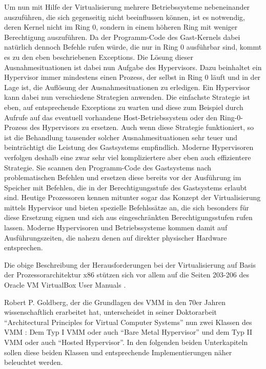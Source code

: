 Um nun mit Hilfe der Virtualisierung mehrere Betriebssysteme nebeneinander auszuführen, die sich gegenseitig nicht beeinflussen können, ist es notwendig, deren Kernel nicht im Ring 0, sondern in einem höheren Ring mit weniger Berechtigung auszuführen. Da der Programm-Code des Gast-Kernels dabei natürlich dennoch Befehle rufen würde, die nur in Ring 0 ausführbar sind, kommt es zu den eben beschriebenen Exceptions. Die Lösung dieser Ausnahmesituationen ist dabei nun Aufgabe des Hypervisors. Dazu beinhaltet ein Hypervisor immer mindestens einen Prozess, der selbst in Ring 0 läuft und in der Lage ist, die Auflösung der Ausnahmesituationen zu erledigen. Ein Hypervisor kann dabei nun verschiedene Strategien anwenden. Die einfachste Strategie ist eben, auf entsprechende Exceptions zu warten und diese zum Beispiel durch Aufrufe auf das eventuell vorhandene Host-Betriebssystem oder den Ring-0-Prozess des Hypervisors zu ersetzen. Auch wenn diese Strategie funktioniert, so ist die Behandlung tausender solcher Ausnahmesituationen sehr teuer und beinträchtigt die Leistung des Gastsystems empfindlich. Moderne Hypervisoren verfolgen deshalb eine zwar sehr viel kompliziertere aber eben auch effizientere Strategie. Sie scannen den Programm-Code des Gastsystems nach problematischen Befehlen und ersetzen diese bereits vor der Ausführung im Speicher mit Befehlen, die in der Berechtigungsstufe des Gastsystems erlaubt sind. Heutige Prozessoren kennen mitunter sogar das Konzept der Virtualisierung mittels Hypervisor und bieten spezielle Befehlssätze an, die sich besonders für diese Ersetzung eignen und sich aus eingeschränkten Berechtigungsstufen rufen lassen. Moderne Hypervisoren und Betriebssysteme kommen damit auf Ausführungszeiten, die nahezu denen auf direkter physischer Hardware entsprechen.

Die obige Beschreibung der Herausforderungen bei der Virtualisierung auf Basis der Prozessorarchitektur x86 stützen sich vor allem auf die Seiten 203-206 des Oracle VM VirtualBox User Manuals \citep{Oracle14}.

Robert P. Goldberg, der die Grundlagen des \ac{VMM} in den 70er Jahren wissenschaftlich erarbeitet hat, unterscheidet in seiner Doktorarbeit "`Architectural Principles for Virtual Computer Systems"' nun zwei Klassen des \ac{VMM} \citep[vgl.][S. 22 ff.]{Goldberg73}: Dem Typ I \ac{VMM} oder auch "`Bare Metal Hypervisor"' und dem Typ II \ac{VMM} oder auch "`Hosted Hypervisor"'. In den folgenden beiden Unterkapiteln sollen diese beiden Klassen und entsprechende Implementierungen näher beleuchtet werden.

